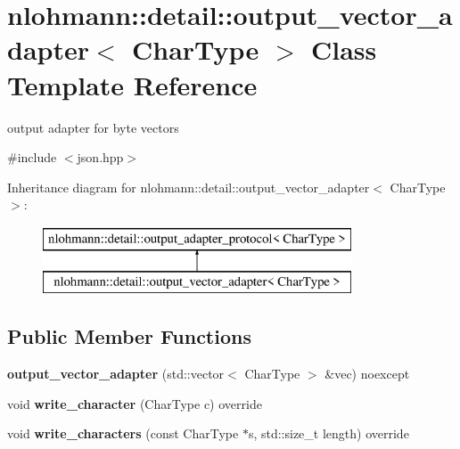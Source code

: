 \hypertarget{classnlohmann_1_1detail_1_1output__vector__adapter}{}\section{nlohmann\+:\+:detail\+:\+:output\+\_\+vector\+\_\+adapter$<$ Char\+Type $>$ Class Template Reference}
\label{classnlohmann_1_1detail_1_1output__vector__adapter}


output adapter for byte vectors  




{\ttfamily \#include $<$json.\+hpp$>$}

Inheritance diagram for nlohmann\+:\+:detail\+:\+:output\+\_\+vector\+\_\+adapter$<$ Char\+Type $>$\+:\begin{figure}[H]
\begin{center}
\leavevmode
\includegraphics[height=2.000000cm]{classnlohmann_1_1detail_1_1output__vector__adapter}
\end{center}
\end{figure}
\subsection*{Public Member Functions}
\begin{DoxyCompactItemize}
\item 
\mbox{\label{classnlohmann_1_1detail_1_1output__vector__adapter_a9c4fbf88fda356837038ec30a264cd3e}} 
{\bfseries output\+\_\+vector\+\_\+adapter} (std\+::vector$<$ Char\+Type $>$ \&vec) noexcept
\item 
\mbox{\label{classnlohmann_1_1detail_1_1output__vector__adapter_af6a22d4210bb7bc2da66021300ddd6db}} 
void {\bfseries write\+\_\+character} (Char\+Type c) override
\item 
\mbox{\label{classnlohmann_1_1detail_1_1output__vector__adapter_ad6f6c461dec7bedd5359454dc22fc9aa}} 
void {\bfseries write\+\_\+characters} (const Char\+Type $\ast$s, std\+::size\+\_\+t length) override
\end{DoxyCompactItemize}
